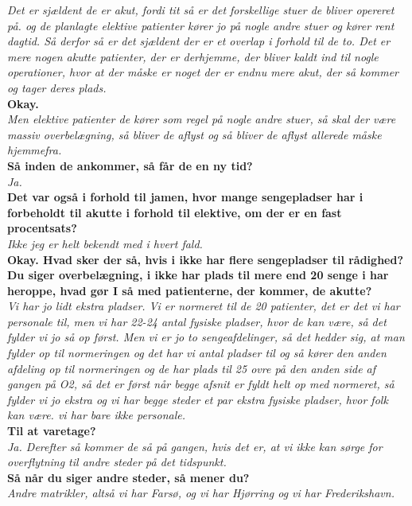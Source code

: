 \textit{Det er sjældent de er akut, fordi tit så er det forskellige stuer de bliver opereret på. og de planlagte elektive patienter kører jo på nogle andre stuer og kører rent dagtid. Så derfor så er det sjældent der er et overlap i forhold til de to. Det er mere nogen akutte patienter, der er derhjemme, der bliver kaldt ind til nogle operationer, hvor at der måske er noget der er endnu mere akut, der så kommer og tager deres plads.} \\
\noindent
\textbf{Okay.} \\
\noindent
\textit{Men elektive patienter de kører som regel på nogle andre stuer, så skal der være massiv overbelægning, så bliver de aflyst og så bliver de aflyst allerede måske hjemmefra.} \\
\noindent
\textbf{Så inden de ankommer, så får de en ny tid?} \\
\noindent
\textit{Ja.} \\
\noindent
\textbf{Det var også i forhold til jamen, hvor mange sengepladser har i forbeholdt til akutte i forhold til elektive, om der er en fast procentsats?} \\
\noindent
\textit{Ikke jeg er helt bekendt med i hvert fald.} \\
\noindent
\textbf{Okay. Hvad sker der så, hvis i ikke har flere sengepladser til rådighed? Du siger overbelægning, i ikke har plads til mere end 20 senge i har heroppe, hvad gør I så med patienterne, der kommer, de akutte?} \\
\noindent
\textit{Vi har jo lidt ekstra pladser. Vi er normeret til de 20 patienter, det er det vi har personale til, men vi har 22-24 antal fysiske pladser, hvor de kan være, så det fylder vi jo så op først. Men vi er jo to sengeafdelinger, så det hedder sig, at man fylder op til normeringen og det har vi antal pladser til og så kører den anden afdeling op til normeringen og de har plads til 25 ovre på den anden side af gangen på O2, så det er først når begge afsnit er fyldt helt op med normeret, så fylder vi jo ekstra og vi har begge steder et par ekstra fysiske pladser, hvor folk kan være. vi har bare ikke personale.} \\
\noindent
\textbf{Til at varetage?} \\
\noindent
\textit{Ja. Derefter så kommer de så på gangen, hvis det er, at vi ikke kan sørge for overflytning til andre steder på det tidspunkt.} \\
\noindent
\textbf{Så når du siger andre steder, så mener du?} \\
\noindent
\textit{Andre matrikler, altså vi har Farsø, og vi har Hjørring og vi har Frederikshavn.} \\
